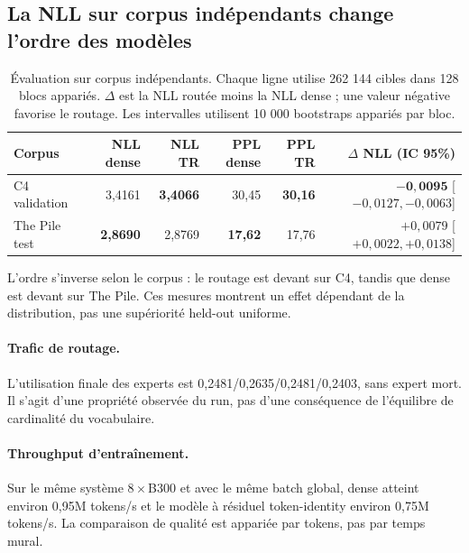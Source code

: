 \documentclass[10pt]{article}
\theoremstyle{definition}
\theoremstyle{remark}
\begin{document}
\subsection{La NLL sur corpus ind\'{e}pendants change l'ordre des mod\`{e}les}
\label{sec:heldout_300m}

\begin{table}[H]
\centering
\small
\setlength{\tabcolsep}{3.5pt}
\caption{\'{E}valuation sur corpus ind\'{e}pendants. Chaque ligne utilise 262 144 cibles dans 128 blocs appari\'{e}s. $\Delta$ est la NLL rout\'{e}e moins la NLL dense ; une valeur n\'{e}gative favorise le routage. Les intervalles utilisent 10 000 bootstraps appari\'{e}s par bloc.}
\label{tab:heldout_300m}
\begin{tabular}{lrrrrr}
\toprule
\textbf{Corpus} & \textbf{NLL dense} & \textbf{NLL TR} & \textbf{PPL dense} & \textbf{PPL TR} & \textbf{$\Delta$ NLL (IC 95\%)} \\
\midrule
C4 validation & 3,4161 & \textbf{3,4066} & 30,45 & \textbf{30,16} & $\mathbf{-0,0095}$ [$-0,0127,-0,0063$] \\
The Pile test & \textbf{2,8690} & 2,8769 & \textbf{17,62} & 17,76 & $+0,0079$ [$+0,0022,+0,0138$] \\
\bottomrule
\end{tabular}
\end{table}

L'ordre s'inverse selon le corpus : le routage est devant sur C4, tandis que dense est devant sur The Pile. Ces mesures montrent un effet d\'{e}pendant de la distribution, pas une sup\'{e}riorit\'{e} held-out uniforme.

\FloatBarrier

\paragraph{Trafic de routage.} L'utilisation finale des experts est 0,2481/0,2635/0,2481/0,2403, sans expert mort. Il s'agit d'une propri\'{e}t\'{e} observ\'{e}e du run, pas d'une cons\'{e}quence de l'\'{e}quilibre de cardinalit\'{e} du vocabulaire.

\paragraph{Throughput d'entra\^{i}nement.} Sur le m\^{e}me syst\`{e}me $8\times$B300 et avec le m\^{e}me batch global, dense atteint environ 0,95M tokens/s et le mod\`{e}le \`{a} r\'{e}siduel token-identity environ 0,75M tokens/s. La comparaison de qualit\'{e} est appari\'{e}e par tokens, pas par temps mural.
\end{document}
